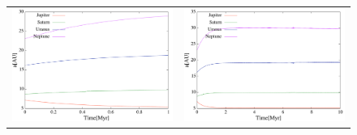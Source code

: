 \documentclass[11pt,a4paper,oneside,onecolumn]{jarticle}
\begin{document}
\begin{figure}[H]
\begin{tabular}{cc}
\begin{minipage}[t]{0.45\hsize}
\centering
\includegraphics[width=7.6cm]{./image/move5Myr_a_1Myr.pdf}
\end{minipage} &
\begin{minipage}[t]{0.45\hsize}
\centering
\includegraphics[width=7.6cm]{./image/move5Myr_a_10Myr.pdf}
\end{minipage}
%
\end{tabular}
\caption{\label{}}
\end{figure}
\end{document}
